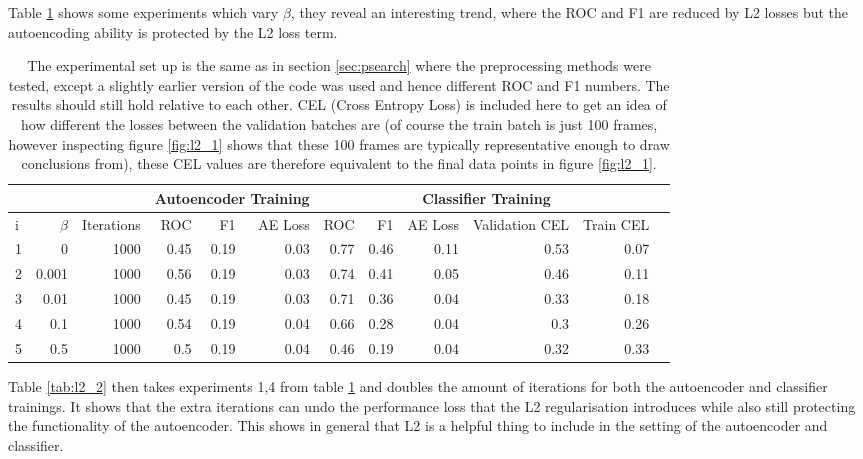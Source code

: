       Table \ref{tab:l2_1} shows some experiments which vary $\beta$, they reveal an
      interesting trend, where the ROC and F1 are reduced by L2 losses but the autoencoding
      ability is protected by the L2 loss term.

      \begin{table}[!h] {\footnotesize \centering
      \begin{tabular}{lrrrrrrrrrrr}
        &&&   \multicolumn{3}{|c|}{Autoencoder Training} &  \multicolumn{5}{c|}{Classifier Training}  \\
      \hline
       i & $\beta$ &   Iterations &   ROC&F1&AE Loss & ROC & F1 & AE Loss &   Validation CEL &   Train CEL \\
      \hline
       1 &     0     & 1000 &    0.45 &   0.19 &     0.03 &    0.77 &   0.46 &     0.11 &  0.53 &  0.07 \\
       2 &     0.001 & 1000 &    0.56 &   0.19 &     0.03 &    0.74 &   0.41 &     0.05 &  0.46 &  0.11 \\
       3 &     0.01  & 1000 &    0.45 &   0.19 &     0.03 &    0.71 &   0.36 &     0.04 &  0.33 &  0.18 \\
       4 &     0.1   & 1000 &    0.54 &   0.19 &     0.04 &    0.66 &   0.28 &     0.04 &  0.3  &  0.26 \\
       5 &     0.5   & 1000 &    0.5  &   0.19 &     0.04 &    0.46 &   0.19 &     0.04 &  0.32 &  0.33 \\
      \hline
    \end{tabular}
    \caption{The experimental set up is the same as in section \ref{sec:psearch} where the preprocessing methods
    were tested, except a slightly earlier version
    of the code was used and hence different ROC and F1 numbers.
    The results should still hold relative to each other.
    CEL (Cross Entropy Loss) is included here to get an idea of how different
    the losses between the validation batches are (of course the
    train batch is just 100 frames, however inspecting figure \ref{fig:l2_1} shows that
    these 100 frames are typically representative enough to draw conclusions from), these
    CEL values are therefore equivalent to the final data points in figure \ref{fig:l2_1}. } \label{tab:l2_1}
    }
    \end{table}

    Table \ref{tab:l2_2} then takes experiments 1,4 from table \ref{tab:l2_1} and doubles
    the amount of iterations for both the autoencoder and classifier trainings. It shows
    that the extra iterations can undo the performance loss that the L2 regularisation
    introduces while also still protecting the functionality of the autoencoder.
    This shows in general that L2 is a helpful thing to include in the setting of the autoencoder
    and classifier.

